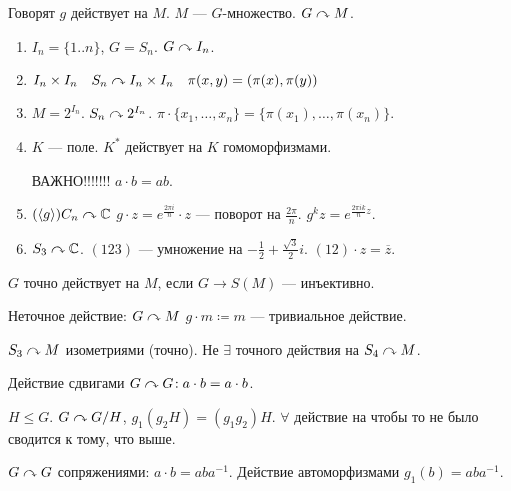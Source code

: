 Говорят $g$ действует на  $M$.  $M$ ---  $G$-множество.  $G \curvearrowright M$.
\begin{example}
    \begin{enumerate}
        \item $I_n = \{1..n\}$,  $G = S_n$.  $G \curvearrowright I_n$.
        \item  $I_n \times I_n \quad S_n \curvearrowright I_n \times I_n \quad \pi(x, y) = (\pi(x), \pi(y))$
        \item  $M=2^{I_n}$.  $S_n \curvearrowright 2^{I_n}$.  $\pi \cdot \{x_1, \ldots, x_n\} = \{\pi(x_1),\ldots, \pi(x_n)\}$.
        \item $K$ --- поле.  $K^*$ действует на  $K$ гомоморфизмами.

            ВАЖНО!!!!!!!  $a\cdot b = ab$.
        \item  $(\langle g \rangle)C_n \curvearrowright \mathbb{C}$  $g \cdot z = e^{\frac{2\pi i}{n}} \cdot z$ --- поворот на $\frac{2\pi}{n}$. $g^{k}z = e^{\frac{2\pi i k}{n}z}.$
        \item $S_3 \curvearrowright \mathbb{C}$.  $(123)$ --- умножение на  $-\frac{1}{2} + \frac{\sqrt{3}}{2}i$. $(12) \cdot z = \overline{z}$.
    \end{enumerate}
\end{example}
\begin{definition}
    $G$ точно действует на  $M$, если  $G \to S(M)$ --- инъективно.

    Неточное действие: $G \curvearrowright M$  $g \cdot m \coloneqq m$ --- тривиальное действие.
\end{definition}

$S_3 \curvearrowright M$ изометриями (точно).  Не $\exists$ точного действия на  $S_4 \curvearrowright M$.
\begin{example}
Действие сдвигами $G \curvearrowright G\!: a \cdot b = a \cdot b$.

 $H \le G$. $G \curvearrowright G / H$,  $g_1 (g_2H) = (g_1g_2)H$.
 $\forall $ действие на чтобы то не было сводится к тому, что выше.

  $G \curvearrowright G$ сопряжениями:  $a \cdot b = aba^{-1}$. Действие автоморфизмами  $g_1(b) = aba^{-1}$.
\end{example}

